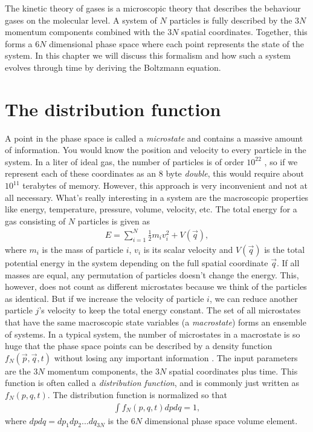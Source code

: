 The kinetic theory of gases is a microscopic theory that describes the behaviour gases on the molecular level. A system of $N$ particles is fully described by the $3N$ momentum components combined with the $3N$ spatial coordinates. Together, this forms a $6N$ dimensional phase space where each point represents the state of the system. In this chapter we will discuss this formalism and how such a system evolves through time by deriving the Boltzmann equation. 

\section{The distribution function}
A point in the phase space is called a \textit{microstate} and contains a massive amount of information. You would know the position and velocity to every particle in the system. In a liter of ideal gas, the number of particles is of order $10^{22}$ \cite{lien2001generell}, so if we represent each of these coordinates as an 8 byte \textit{double}, this would require about $10^{11}$ terabytes of memory. However, this approach is very inconvenient and not at all necessary. What's really interesting in a system are the macroscopic properties like energy, temperature, pressure, volume, velocity, etc. The total energy for a gas consisting of $N$ particles is given as
\begin{align*}
	E = \sum_{i=1}^N \frac{1}{2} m_i v_i^2 + V(\vec q),
\end{align*}
where $m_i$ is the mass of particle $i$, $v_i$ is its scalar velocity and $V(\vec q)$ is the total potential energy in the system depending on the full spatial coordinate $\vec q$. If all masses are equal, any permutation of particles doesn't change the energy. This, however, does not count as different microstates because we think of the particles as identical. But if we increase the velocity of particle $i$, we can reduce another particle $j$'s velocity to keep the total energy constant. The set of all microstates that have the same macroscopic state variables (a \textit{macrostate}) forms an ensemble of systems. In a typical system, the number of microstates in a macrostate is so huge that the phase space points can be described by a density function $f_N(\vec p, \vec q, t)$ without losing any important information \cite{mcquarrie1973statistical}. The input parameters are the $3N$ momentum components, the $3N$ spatial coordinates plus time. This function is often called a \textit{distribution function}, and is commonly just written as $f_N(p, q, t)$. The distribution function is normalized so that
\begin{align}
	\int f_N(p, q, t) dpdq = 1,
\end{align}
where $dpdq=dp_1dp_2...dq_{3N}$ is the $6N$ dimensional phase space volume element. 

